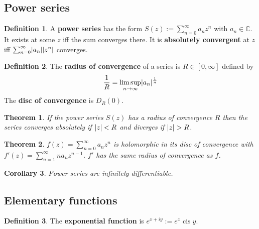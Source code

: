 \documentclass[12pt]{article}
\newtheorem{thm}{Theorem}[section]
\newtheorem{cor}[thm]{Corollary}
\theoremstyle{definition}
\newtheorem{defn}{Definition}[section]
\newcommand{\C}{\mathbb{C}}
\DeclarePairedDelimiter\abs{\lvert}{\rvert}
\DeclareMathOperator{\cis}{cis}
\begin{document}

\subsection{Power series}

\begin{defn}
  A \textbf{power series} has the form $S(z) := \sum_{n = 0}^{\infty}a_nz^n$ with $a_n \in \C$.
  It exists at some $z$ iff the sum converges there.
  It is \textbf{absolutely convergent} at $z$ iff $\sum_{n = 0}^{\infty}\abs{a_n}\abs{z^n}$ converges.
\end{defn}


\begin{defn}
  The \textbf{radius of convergence} of a series is $R \in [0, \infty]$ defined by
  $$\frac{1}{R} = \limsup_{n \to \infty}\abs{a_n}^{\frac{1}{n}}$$
  The \textbf{disc of convergence} is $D_R(0)$.
\end{defn}

\begin{thm}
  If the power series $S(z)$ has a radius of convergence $R$ then the series converges absolutely if $\abs{z} < R$ and diverges if $\abs{z} > R$.
\end{thm}

\begin{thm}
  $f(z) = \sum_{n = 0}^{\infty}a_nz^n$ is holomorphic in its disc of convergence with $f'(z) = \sum_{n = 1}^{\infty}na_nz^{n - 1}$.
  $f'$ has the same radius of convergence as $f$.
\end{thm}

\begin{cor}
  Power series are infinitely differentiable.
\end{cor}


\subsection{Elementary functions}

\begin{defn}
  The \textbf{exponential function} is $e^{x + iy} := e^x\cis{y}$.
\end{defn}
\end{document}
